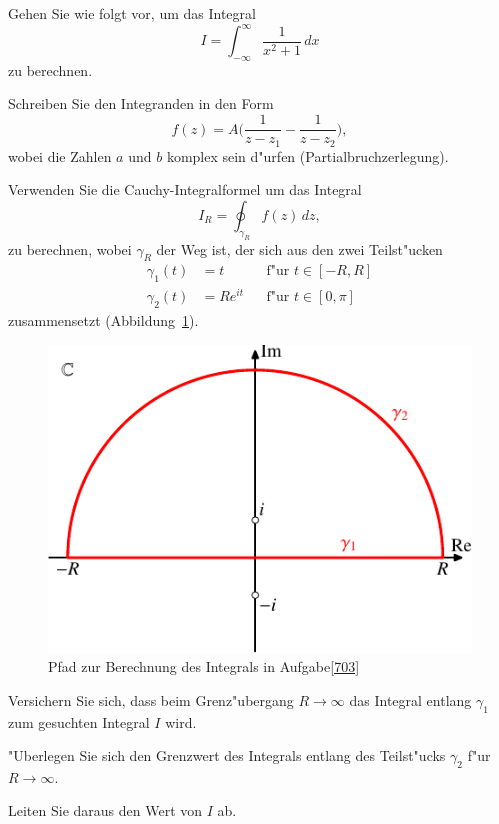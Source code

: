 Gehen Sie wie folgt vor, um das Integral
\[
I=\int_{-\infty}^{\infty} \frac1{x^2 + 1}\,dx
\]
zu berechnen.
\begin{teilaufgaben}
\item Schreiben Sie den Integranden in den Form
\begin{equation}
f(z)=A\biggl(\frac{1}{z-z_1} - \frac{1}{z-z_2}\biggr),
\label{702:fz}
\end{equation}
wobei die Zahlen $a$ und $b$ komplex sein d"urfen (Partialbruchzerlegung).
\item
Verwenden Sie die Cauchy-Integralformel um das Integral
\[
I_R
=
\oint_{\gamma_R}f(z)\,dz,
\]
zu berechnen,
wobei $\gamma_R$ der Weg ist, der sich aus den zwei Teilst"ucken
\[
\begin{aligned}
\gamma_1(t)&=t&&\text{f"ur $t\in[-R,R]$}\\
\gamma_2(t)&=Re^{it}&&\text{f"ur $t\in[0,\pi]$}
\end{aligned}
\]
zusammensetzt (Abbildung~\ref{703:path}).
\begin{figure}
\centering
\includegraphics{../skript/uebungsaufgaben/path-1.pdf}
\caption{Pfad zur Berechnung des Integrals in Aufgabe\ref{703}
\label{703:path}}
\end{figure}
\item 
Versichern Sie sich, dass beim Grenz"ubergang $R\to\infty$ das Integral
entlang $\gamma_1$ zum gesuchten Integral $I$ wird.
\item
"Uberlegen Sie sich den Grenzwert des Integrals entlang des Teilst"ucks
$\gamma_2$ f"ur $R\to\infty$.
\item
Leiten Sie daraus den Wert von $I$ ab.
\end{teilaufgaben}

